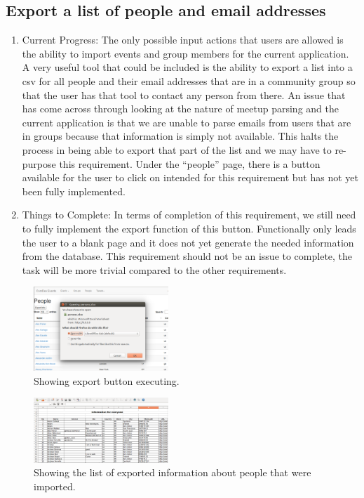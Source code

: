 \documentclass[letterpaper,10pt,onecolumn]{IEEEtran} %
\begin{document}
\subsection{Export a list of people and email addresses}
\begin{enumerate}[label*=\arabic*.]
\item Current Progress: The only possible input actions that users are allowed is the ability to import events and group members for the current application. A very useful tool that could be included is the ability to export a list into a csv for all people and their email addresses that are in a community group so that the user has that tool to contact any person from there. An issue that has come across through looking at the nature of meetup parsing and the current application is that we are unable to parse emails from users that are in groups because that information is simply not available. This halts the process in being able to export that part of the list and we may have to re-purpose this requirement. Under the “people” page, there is a button available for the user to click on intended for this requirement but has not yet been fully implemented.

\item Things to Complete: In terms of completion of this requirement, we still need to fully implement the export function of this button. Functionally only leads the user to a blank page and it does not yet generate the needed information from the database. This requirement should not be an issue to complete, the task will be more trivial compared to the other requirements.
\end{enumerate}

\begin{figure}[htp]
  \begin{center}
  
  \includegraphics[width=2in]{exporting1}
  \centering
  \caption{Showing export button executing. }

  \end{center}
\end{figure}

\begin{figure}[htp]
  \begin{center}
  
  \includegraphics[width=2in]{exporting2}
  \centering
  \caption{Showing the list of exported information about people that were imported. }

  \end{center}
\end{figure}
\end{document}
